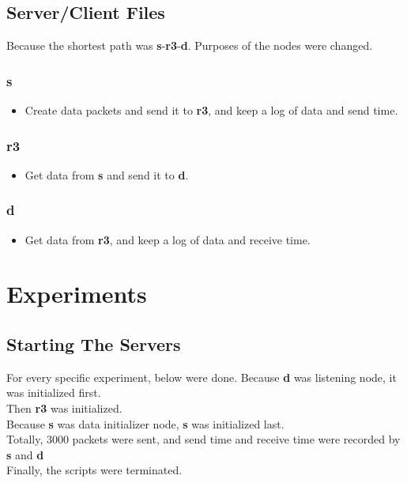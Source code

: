 \documentclass[conference]{IEEEtran}
\begin{document}
\subsection{Server/Client Files}

Because the shortest path was \textbf{s}-\textbf{r3}-\textbf{d}. Purposes of the nodes were changed.
\subsubsection{\textbf{s}}
\begin{itemize}
    \item Create data packets and send it to \textbf{r3}, and keep a log of data and send time. 
\end{itemize}
\subsubsection{\textbf{r3}}
\begin{itemize}
    \item Get data from \textbf{s} and send it to \textbf{d}.
\end{itemize}
\subsubsection{\textbf{d}}
\begin{itemize}
    \item Get data from \textbf{r3}, and keep a log of data and receive time. 
\end{itemize}

\section{Experiments}

\subsection{Starting The Servers}

For every specific experiment, below were done.
Because \textbf{d} was listening node, it was initialized first. \\
Then \textbf{r3} was initialized. \\
Because \textbf{s} was data initializer node, \textbf{s} was initialized last. \\
Totally, 3000 packets were sent, and send time and receive time were recorded by \textbf{s} and \textbf{d} \\
Finally, the scripts were terminated.
\end{document}
